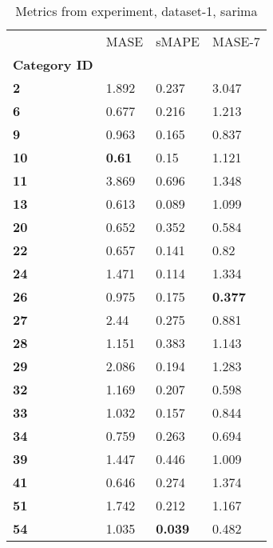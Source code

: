 \begin{table}[H]
\centering
\caption{Metrics from experiment, dataset-1, sarima}
\label{table:sarima-dataset-1}
\begin{tabular}{llll}
\toprule
{} &           MASE &           sMAPE &          MASE-7 \\
\textbf{Category ID} &                &                 &                 \\
\midrule
\textbf{2          } &          1.892 &           0.237 &           3.047 \\
\textbf{6          } &          0.677 &           0.216 &           1.213 \\
\textbf{9          } &          0.963 &           0.165 &           0.837 \\
\textbf{10         } &  \textbf{0.61} &            0.15 &           1.121 \\
\textbf{11         } &          3.869 &           0.696 &           1.348 \\
\textbf{13         } &          0.613 &           0.089 &           1.099 \\
\textbf{20         } &          0.652 &           0.352 &           0.584 \\
\textbf{22         } &          0.657 &           0.141 &            0.82 \\
\textbf{24         } &          1.471 &           0.114 &           1.334 \\
\textbf{26         } &          0.975 &           0.175 &  \textbf{0.377} \\
\textbf{27         } &           2.44 &           0.275 &           0.881 \\
\textbf{28         } &          1.151 &           0.383 &           1.143 \\
\textbf{29         } &          2.086 &           0.194 &           1.283 \\
\textbf{32         } &          1.169 &           0.207 &           0.598 \\
\textbf{33         } &          1.032 &           0.157 &           0.844 \\
\textbf{34         } &          0.759 &           0.263 &           0.694 \\
\textbf{39         } &          1.447 &           0.446 &           1.009 \\
\textbf{41         } &          0.646 &           0.274 &           1.374 \\
\textbf{51         } &          1.742 &           0.212 &           1.167 \\
\textbf{54         } &          1.035 &  \textbf{0.039} &           0.482 \\
\bottomrule
\end{tabular}
\end{table}
